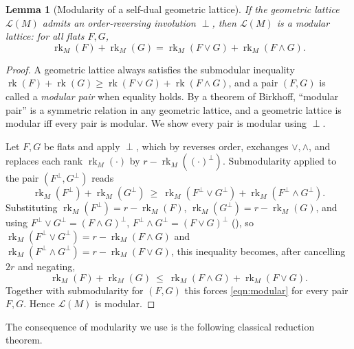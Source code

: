 \documentclass{article}
\newtheorem{lemma}[theorem]{Lemma}
\theoremstyle{definition}
\newcommand{\rk}{\operatorname{rk}}
\newcommand{\cLL}{\mathcal{L}}
\begin{document}
\begin{lemma}[Modularity of a self-dual geometric lattice]\label{lem:modular}
If the geometric lattice $\cLL(M)$ admits an order-reversing involution $\perp$, then $\cLL(M)$ is a
modular lattice: for all flats $F,G$,
\begin{equation}\label{eqn:modular}
  \rk_M(F)+\rk_M(G)=\rk_M(F\vee G)+\rk_M(F\wedge G).
\end{equation}
\end{lemma}

\begin{proof}
A geometric lattice always satisfies the submodular inequality $\rk(F)+\rk(G)\ge\rk(F\vee G)+\rk(F
\wedge G)$, and a pair $(F,G)$ is called a \emph{modular pair} when equality holds. By a theorem of
Birkhoff, ``modular pair'' is a symmetric relation in any geometric lattice, and a geometric lattice
is modular iff every pair is modular. We show every pair is modular using $\perp$.

Let $F,G$ be flats and apply $\perp$, which by  reverses order, exchanges $\vee,\wedge$,
and replaces each rank $\rk_M(\cdot)$ by $r-\rk_M((\cdot)^{\perp})$. Submodularity applied to the pair
$(F^{\perp},G^{\perp})$ reads
\[
  \rk_M(F^{\perp})+\rk_M(G^{\perp})\ \ge\ \rk_M(F^{\perp}\vee G^{\perp})+\rk_M(F^{\perp}\wedge
  G^{\perp}).
\]
Substituting $\rk_M(F^{\perp})=r-\rk_M(F)$, $\rk_M(G^{\perp})=r-\rk_M(G)$, and using
$F^{\perp}\vee G^{\perp}=(F\wedge G)^{\perp}$, $F^{\perp}\wedge G^{\perp}=(F\vee G)^{\perp}$
(), so $\rk_M(F^{\perp}\vee G^{\perp})=r-\rk_M(F\wedge G)$ and $\rk_M(F^{\perp}\wedge
G^{\perp})=r-\rk_M(F\vee G)$, this inequality becomes, after cancelling $2r$ and negating,
\[
  \rk_M(F)+\rk_M(G)\ \le\ \rk_M(F\wedge G)+\rk_M(F\vee G).
\]
Together with submodularity for $(F,G)$ this forces \eqref{eqn:modular} for every pair $F,G$. Hence
$\cLL(M)$ is modular.
\end{proof}

The consequence of modularity we use is the following classical reduction theorem.
\end{document}
